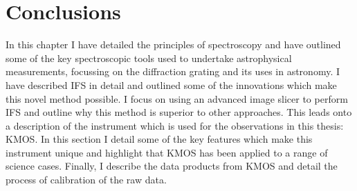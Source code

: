 
\section{Conclusions} %
\label{sec:conclusions}

In this chapter I have detailed the principles of spectroscopy and have outlined some of the key spectroscopic tools used to undertake astrophysical measurements, focussing on the diffraction grating and its uses in astronomy.
I have described IFS in detail and outlined some of the innovations which make this novel method possible.
I focus on using an advanced image slicer to perform IFS and outline why this method is superior to other approaches.
This leads onto a description of the instrument which is used for the observations in this thesis: KMOS.
In this section I detail some of the key features which make this instrument unique and highlight that KMOS has been applied to a range of science cases.
Finally, I describe the data products from KMOS and detail the process of calibration of the raw data.

